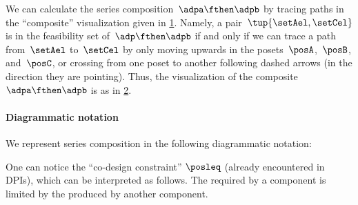 We can calculate the series composition~$\adpa \fthen \adpb$ by tracing paths in the ``composite'' visualization given in \cref{fig:example_dp_graph_xyz}.
Namely, a pair~$\tup{\setAel, \setCel}$ is in the feasibility set of~$\adp \fthen \adpb$ if and only if we can trace a path from~$\setAel$ to~$\setCel$ by only moving upwards in the posets~$\posA$,~$\posB$, and~$\posC$, or crossing from one poset to another following dashed arrows (in the direction they are pointing).
Thus, the visualization of the composite~$\adpa \fthen \adpb$ is as in \cref{fig:example_dp_graph_xz}.
\begin{figure}[h!]
    \centering
    \caption{}
    \label{fig:example_dp_graph_xyz}
\end{figure}
\begin{figure}[h!]
    \centering
    \caption{}
    \label{fig:example_dp_graph_xz}
\end{figure}


\paragraph{Diagrammatic notation}
We represent series composition in the following diagrammatic notation:


One can notice the ``co-design constraint'' $\posleq$ (already encountered in DPIs), which can be interpreted as follows.
The  required by a component is limited by the  produced by another component.

